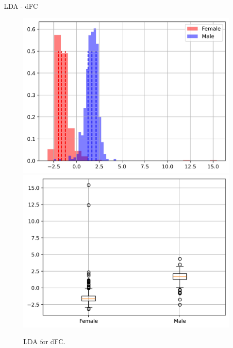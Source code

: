 \documentclass{beamer}
\begin{document}
\begin{frame}{LDA - dFC}
\begin{figure}[H]
{\begin{minipage}[b]{0.3\textwidth}
                \includegraphics[width=1\textwidth]{../Analysis/LDA/node=50_size=480_step=180_rho=0.1/hist.jpg}
                \includegraphics[width=1\textwidth]{../Analysis/LDA/node=50_size=480_step=180_rho=0.1/box.jpg}
            \end{minipage}
        }
        \caption{LDA for dFC.}
    \end{figure}

\end{frame}
\end{document}
